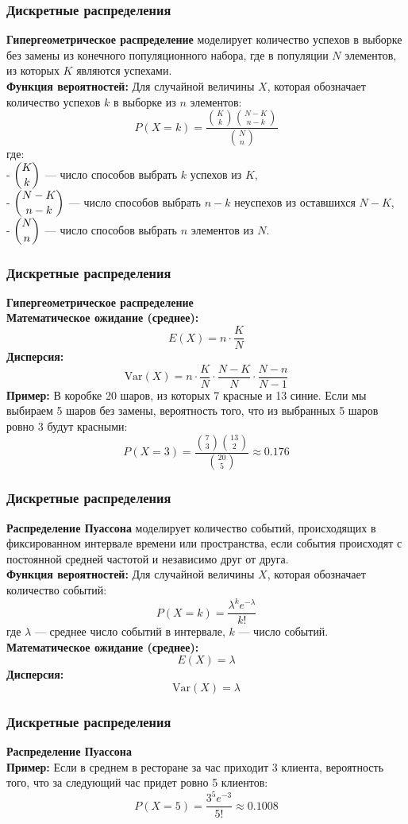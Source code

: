 \documentclass[aspectratio=169]{beamer}
\begin{document}
\begin{frame}
\frametitle{Дискретные распределения}
{\bf Гипергеометрическое распределение} моделирует количество успехов в выборке без замены из конечного популяционного набора, где в популяции \( N \) элементов, из которых \( K \) являются успехами.\\
{\bf Функция вероятностей:} Для случайной величины \( X \), которая обозначает количество успехов \( k \) в выборке из \( n \) элементов:
  \[
  P(X = k) = \dfrac{\binom{K}{k} \binom{N - K}{n - k}}{\binom{N}{n}}
  \]
  где:
\\  - \( \dbinom{K}{k} \) — число способов выбрать \( k \) успехов из \( K \),
\\ - \( \dbinom{N - K}{n - k} \) — число способов выбрать \( n - k \) неуспехов из оставшихся \( N - K \),
\\ - \( \dbinom{N}{n} \) — число способов выбрать \( n \) элементов из \( N \).\\
\end{frame}

\begin{frame}
\frametitle{Дискретные распределения}
{\bf Гипергеометрическое распределение}\\
{\bf Математическое ожидание (среднее):}
  \[
  E(X) = n \cdot \frac{K}{N}
  \]
{\bf Дисперсия:}
  \[
  \text{Var}(X) = n \cdot \frac{K}{N} \cdot \frac{N - K}{N} \cdot \frac{N - n}{N - 1}
  \]
{\bf Пример:} В коробке 20 шаров, из которых 7 красные и 13 синие. Если мы выбираем 5 шаров без замены, вероятность того, что из выбранных 5 шаров ровно 3 будут красными:
  \[
  P(X = 3) = \frac{\binom{7}{3} \binom{13}{2}}{\binom{20}{5}} \approx 0.176
  \]
\end{frame}

\begin{frame}
\frametitle{Дискретные распределения}
{\bf Распределение Пуассона} моделирует количество событий, происходящих в фиксированном интервале времени или пространства, если события происходят с постоянной средней частотой и независимо друг от друга.\\
{\bf Функция вероятностей:} Для случайной величины \( X \), которая обозначает количество событий:
  \[
  P(X = k) = \frac{\lambda^k e^{-\lambda}}{k!}
  \]
где \( \lambda \) — среднее число событий в интервале, \( k \) — число событий.\\
{\bf Математическое ожидание (среднее):}
  \[
  E(X) = \lambda
  \]
{\bf Дисперсия:}
  \[
  \text{Var}(X) = \lambda
  \]
\end{frame}

\begin{frame}
\frametitle{Дискретные распределения}
{\bf Распределение Пуассона}\\
{\bf Пример:} Если в среднем в ресторане за час приходит 3 клиента, вероятность того, что за следующий час придет ровно 5 клиентов:
  \[
  P(X = 5) = \frac{3^5 e^{-3}}{5!} \approx 0.1008
  \]
\end{frame}
\end{document}
